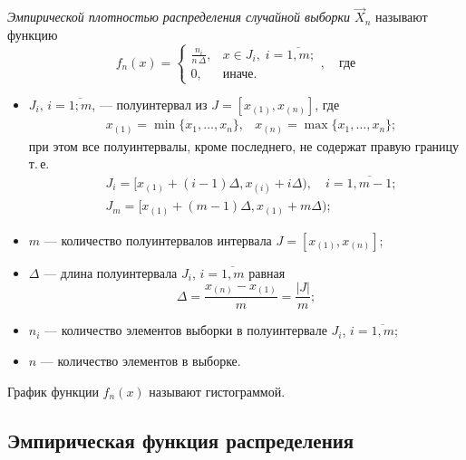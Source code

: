 \begin{defn}
    \emph{Эмпирической плотностью распределения случайной выборки $\vec{X}_n$} называют функцию
    \begin{equation}
        f_n(x) =
        \begin{cases}
            \frac{n_i}{n \, \Delta}, &x \in J_i,\; i = \overline{1, m};\\
            0, &\text{иначе}.
        \end{cases}, \quad \text{где}
    \end{equation}
    \begin{itemize}
        \item $J_i,\, i = \overline{1; m}$, --- полуинтервал из $J = [x_{(1)}, x_{(n)}]$, где 
        \begin{align}
            &x_{(1)} = \min\{ x_1, \dots, x_n \}, &x_{(n)} = \max\{ x_1, \dots, x_n \};
        \end{align}
        при этом все полуинтервалы, кроме последнего, не содержат правую границу т.\,е.
        \begin{align}
            &J_i = [ x_{(1)} + (i-1)\Delta, x_{(i)} + i\Delta), \quad i = \overline{1, m-1};
            \\
            &J_m = [ x_{(1)} + (m-1)\Delta, x_{(1)} + m\Delta);
        \end{align}
        \item $m$ --- количество полуинтервалов интервала $J = [x_{(1)}, x_{(n)}]$;
        \item $\Delta$ --- длина полуинтервала $J_i$, $i = \overline{1, m}$ равная
        \begin{equation}
            \Delta = \frac{x_{(n)} - x_{(1)}}{m} = \frac{|J|}{m};
        \end{equation}
        \item $n_i$ --- количество элементов выборки в полуинтервале $J_i$, $i = \overline{1, m}$;
        \item $n$ --- количество элементов в выборке.

    \end{itemize}
\end{defn}

\begin{defn}
    График функции $f_n(x)$ называют гистограммой.
\end{defn}

\subsection{Эмпирическая функция распределения}

